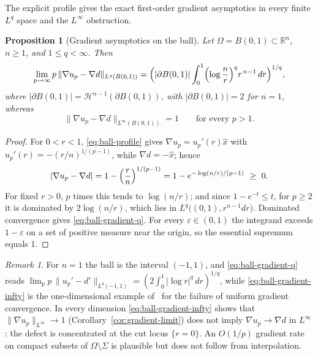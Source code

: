 \documentclass[11pt]{article}
\newcommand{\R}{\mathbb R}
\newcommand{\abs}[1]{\lvert #1\rvert}
\newcommand{\norm}[1]{\lVert #1\rVert}
\newtheorem{proposition}[theorem]{Proposition}
\theoremstyle{definition}
\theoremstyle{remark}
\newtheorem{remark}[theorem]{Remark}
\begin{document}
The explicit profile gives the exact first-order gradient asymptotics in every
finite $L^q$ space and the $L^\infty$ obstruction.
\begin{proposition}[Gradient asymptotics on the ball]\label{prop:ball-gradient}
Let $\Omega=B(0,1)\subset\R^n$, $n\ge1$, and $1\le q<\infty$. Then
\begin{equation}\label{eq:ball-gradient-q}
\lim_{p\to\infty}p\,\norm{\nabla u_p-\nabla d}_{L^q(B(0,1))}
=\Bigl(\abs{\partial B(0,1)}\int_0^1
\Bigl(\log\frac nr\Bigr)^{q}r^{\,n-1}\,dr\Bigr)^{1/q},
\end{equation}
where $\abs{\partial B(0,1)}=\mathcal H^{n-1}(\partial B(0,1))$, with
$\abs{\partial B(0,1)}=2$ for $n=1$, whereas
\begin{equation}\label{eq:ball-gradient-infty}
\norm{\nabla u_p-\nabla d}_{L^\infty(B(0,1))}=1
\qquad\text{for every }p>1.
\end{equation}
\end{proposition}
\begin{proof}
For $0<r<1$, \eqref{eq:ball-profile} gives $\nabla u_p=u_p'(r)\hat x$ with
$u_p'(r)=-(r/n)^{1/(p-1)}$, while $\nabla d=-\hat x$; hence
\[
\abs{\nabla u_p-\nabla d}=1-\Bigl(\frac rn\Bigr)^{1/(p-1)}
=1-e^{-\log(n/r)/(p-1)}\ \ge\ 0.
\]
For fixed $r>0$, $p$ times this tends to $\log(n/r)$; and since
$1-e^{-t}\le t$, for $p\ge2$ it is dominated by $2\log(n/r)$, which lies in
$L^q\bigl((0,1),r^{n-1}dr\bigr)$. Dominated convergence gives
\eqref{eq:ball-gradient-q}. For every $\varepsilon\in(0,1)$ the integrand
exceeds $1-\varepsilon$ on a set of positive measure near the origin, so the
essential supremum equals $1$.
\end{proof}

\begin{remark}\label{rem:ball-lessons}
For $n=1$ the ball is the interval $(-1,1)$, and \eqref{eq:ball-gradient-q}
reads $\lim_pp\,\norm{u_p'-d'}_{L^q(-1,1)}=(2\int_0^1\abs{\log r}^q\,dr)^{1/q}$,
while \eqref{eq:ball-gradient-infty} is the one-dimensional example
of~\cite{BLR} for the failure of uniform gradient convergence. In every
dimension \eqref{eq:ball-gradient-infty} shows that
$\norm{\nabla u_p}_{L^\infty}\to1$ (Corollary~\ref{cor:gradient-limit}) does
not imply $\nabla u_p\to\nabla d$ in $L^\infty$: the defect is concentrated at
the cut locus $\{r=0\}$. An $O(1/p)$ gradient rate on compact subsets of
$\Omega\setminus\Sigma$ is plausible but does not follow from interpolation.
\end{remark}

\end{document}
